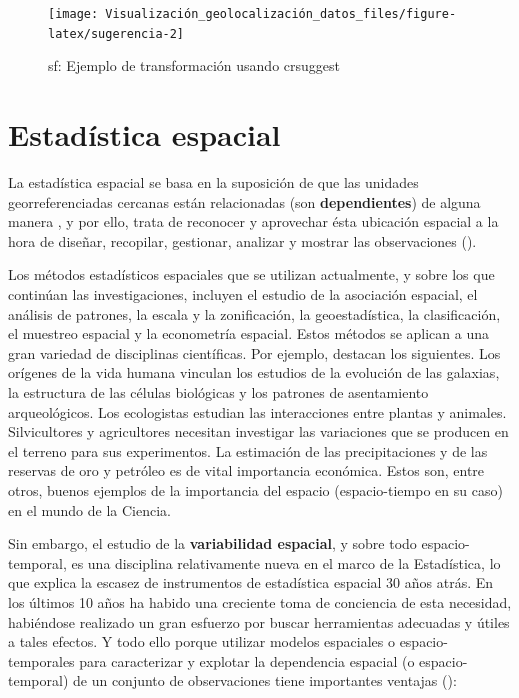\documentclass[
]{report}
\theoremstyle{definition}
\theoremstyle{definition}
\theoremstyle{definition}
\theoremstyle{definition}
\theoremstyle{remark}
\begin{document}
\begin{figure}

{\centering \texttt{[image: Visualización\_geolocalización\_datos\_files/figure-latex/sugerencia-2]} 

}

\caption{sf: Ejemplo de transformación usando crsuggest}\label{fig:sugerencia-2}
\end{figure}

\hypertarget{dep-esp}{%
\chapter{Estadística espacial}\label{dep-esp}}

La estadística espacial se basa en la suposición de que las unidades
georreferenciadas cercanas están relacionadas (son \textbf{dependientes}) de alguna
manera \citep{getis_1999}, y por ello, trata de reconocer y aprovechar ésta ubicación
espacial a la hora de diseñar, recopilar, gestionar, analizar y mostrar las
observaciones (\citet{montero_et_al_2011}).

Los métodos estadísticos espaciales que se utilizan actualmente, y sobre los que
continúan las investigaciones, incluyen el estudio de la asociación espacial, el
análisis de patrones, la escala y la zonificación, la geoestadística, la
clasificación, el muestreo espacial y la econometría espacial. Estos métodos se
aplican a una gran variedad de disciplinas científicas. Por ejemplo,
\citet{montero_et_al_2011} destacan los siguientes. Los orígenes de la vida humana
vinculan los estudios de la evolución de las galaxias, la estructura de las
células biológicas y los patrones de asentamiento arqueológicos. Los ecologistas
estudian las interacciones entre plantas y animales. Silvicultores y
agricultores necesitan investigar las variaciones que se producen en el terreno
para sus experimentos. La estimación de las precipitaciones y de las reservas de
oro y petróleo es de vital importancia económica. Estos son, entre otros, buenos
ejemplos de la importancia del espacio (espacio-tiempo en su caso) en el mundo
de la Ciencia.

Sin embargo, el estudio de la \textbf{variabilidad espacial}, y sobre todo
espacio-temporal, es una disciplina relativamente nueva en el marco de la
Estadística, lo que explica la escasez de instrumentos de estadística espacial
30 años atrás. En los últimos 10 años ha habido una creciente toma de conciencia
de esta necesidad, habiéndose realizado un gran esfuerzo por buscar herramientas
adecuadas y útiles a tales efectos. Y todo ello porque utilizar modelos
espaciales o espacio-temporales para caracterizar y explotar la dependencia
espacial (o espacio-temporal) de un conjunto de observaciones tiene importantes
ventajas (\citet{montero_et_al_2011}):
\end{document}
